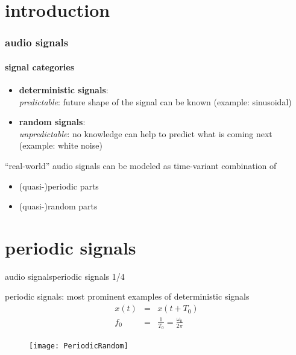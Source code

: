     \section[intro]{introduction}
        \begin{frame}\frametitle{audio signals}\framesubtitle{signal categories}
            \begin{itemize}
                \item	\textbf{deterministic signals}:\\
                        \textit{predictable}: future shape of the signal can be known (example: sinusoidal)
                \pause		
                \item	\textbf{random signals}:\\
                        \textit{unpredictable}: no knowledge can help to predict what is coming next (example: white noise)
            \end{itemize}
            
            \bigskip
            \pause
            ``real-world'' audio signals can be modeled as time-variant combination of 
            \begin{itemize}
                \item	(quasi-)periodic parts
                \item	(quasi-)random parts
            \end{itemize}
        \end{frame}

    \section[periodic]{periodic signals}
        \begin{frame}{audio signals}{periodic signals 1/4}

            periodic signals: most prominent examples of deterministic signals
            \begin{eqnarray*}
                x(t) 	&=& x(t+T_0)\\
                f_0 	&=& \frac{1}{T_0} =  \frac{\omega_0}{2\pi}
            \end{eqnarray*}
            \vspace{-9mm}
            \pause
            
            \begin{figure}
                \centering
                \texttt{[image: PeriodicRandom]}
            \end{figure}
        \end{frame}

